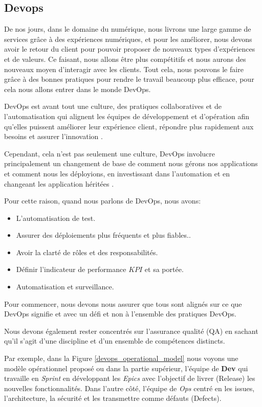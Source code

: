 \subsection{Devops}
De nos jours, dans le domaine du numérique, nous livrons une large gamme de services grâce à des expériences numériques, et pour les améliorer, nous devons avoir le retour du client pour pouvoir proposer de nouveaux types d’expériences et de valeurs. Ce faisant, nous allons être plus compétitifs et nous aurons des nouveaux moyen d'interagir avec les clients.
Tout cela, nous pouvons le faire grâce à des bonnes pratiques pour rendre le travail beaucoup plus efficace, pour cela nous allons entrer dans le monde DevOps.

DevOps est avant tout une culture, des pratiques collaboratives et de l'automatisation qui alignent les équipes de développement et d'opération afin qu'elles puissent améliorer leur expérience client, répondre plus rapidement aux besoins et assurer l'innovation \cite{IsaacSacolick2016DrivingCulture}.

Cependant, cela n'est pas seulement une culture, DevOps involucre principalement un changement de base de comment nous gérons nos applications et comment nous les déployions, en investissant dans l'automation et en changeant les application héritées \cite{benjamin_wootton}.

Pour cette raison, quand nous parlons de DevOps, nous avons:

\begin{itemize}
\item L'automatisation de test.
\item Assurer des déploiements plus fréquents et plus fiables..
\item Avoir la clarté de rôles et des responsabilités.
\item Définir l'indicateur de performance \(KPI\) et sa portée.
\item Automatisation et surveillance.
\end{itemize}

Pour commencer, nous devons nous assurer que tous sont alignés sur ce que DevOps signifie et avec un défi et non à l’ensemble des pratiques DevOps.

Nous devons également rester concentrés sur l’assurance qualité (QA) en sachant qu’il s’agit d’une discipline et d’un ensemble de compétences distincts.

Par exemple, dans la Figure \ref{devops_operational_model} nous voyons une modèle opérationnel proposé ou dans la partie supérieur, l'équipe de \textbf{Dev} qui travaille en \textit{Sprint} en développant les \textit{Epics} avec l'objectif de livrer (Release) les nouvelles fonctionnalités. Dans l'autre côté, l'équipe de \textit{Ops} centré en les issues, l'architecture, la sécurité et les transmettre comme défauts (Defects).


